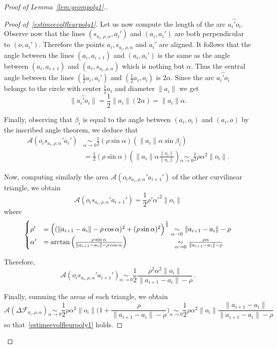 \documentclass[10pt]{amsart}
\theoremstyle{definition}\newtheorem{defi}[theo]{Definition}\newtheorem{rema}[theo]{Remark}\newtheorem{exam}[theo]{Example}\newtheorem{exem}[theo]{Example}\newtheorem{nota}[theo]{Notation}
\newcommand{\cA}{\mathcal{A}}
\newcommand{\cF}{\mathcal{F}}
\newcommand{\noi}{\noindent}
\newenvironment*{prooff}{\begin{proof}}{\let\qed\relax\end{proof}}
\begin{document}
\begin{proof}[{Proof of Lemma~\ref{lem:geompoly1}.}]
\begin{prooff}[{Proof of~\eqref{estimeevolfleurpoly1}}]
Let us now compute the length of the arc $\overset{\frown}{a_i'o_i}$. Observe now that the lines $(s_{a_i,\rho,\alpha},a_i')$ and $(a_i,a_i')$ are both perpendicular to $(o,a_i')$. Therefore the points $a_i, s_{a_i,\rho,\alpha}$ and $a_i'$ are aligned. It follows that the angle between the lines $(a_i,a_{i+1})$ and $(a_i,a_i')$ is the same as the angle between $(a_i,a_{i+1})$ and $(a_i,s_{a_i,\rho,\alpha})$ which is nothing but $\alpha$. Thus the central angle between the lines $(\tfrac{1}{2}a_i,a_i')$ and $(\tfrac{1}{2}a_i,o_i)$ is $2\alpha$. Since the arc $\overset{\frown}{a_i'o_i}$ belongs to the circle with center $\tfrac{1}{2}a_i$ and diameter $\|a_i\|$ we get
\[
\|\overset{\frown}{a_i'o_i}\| = \frac1{2}\|a_i\|(2\alpha) = \|a_i\|\alpha.
\]

Finally, observing that $\beta_i$ is equal to the angle between $(a_i,o_i)$ and $(a_i,o)$ by the inscribed angle theorem, we deduce that
\begin{align*}
\cA\left(o_i s_{a_i,\rho,\alpha}' a_i'\right) &\underset{\alpha\to 0}{\sim} \frac1{2}\left(\rho\sin \alpha\right)\left(\|a_i\|\alpha\sin\beta_i \right) \\
&= \frac1{2}\left(\rho\sin \alpha\right)\left(\|a_i\|\alpha \frac{\|o_i\|}{\|a_i\|}\right)
\underset{\alpha\to 0}{\sim} \frac1{2}\rho \alpha^2\|o_i\|.
\end{align*}

Now, computing similarly the area $\cA(o_i s_{a_i,\rho,\alpha}' a_{i+1}')$ of the other curvilinear triangle, we obtain
\[
\cA\left(o_i s_{a_i,\rho,\alpha}' a_{i+1}'\right) = \frac1{2}\rho' \alpha'^2\|o_i\|
\]
where
\[
\begin{cases}
\rho' & = \Big((\|a_{i+1}-a_i\|-\rho\cos\alpha)^2+(\rho\sin\alpha)^2\Big)^{\frac1{2}} \underset{\alpha\to 0}{\sim} \|a_{i+1}-a_i\|-\rho \\
\alpha' & = \arctan\left(\frac{\rho\sin\alpha}{\|a_{i+1}-a_i\|-\rho\cos\alpha}\right) \mkern120mu\underset{\alpha\to 0}{\sim} \frac{\rho\alpha}{\|a_{i+1}-a_i\|-\rho}
\end{cases}
\]

Therefore,
\[
\cA\left(o_i s_{a_i,\rho,\alpha}' a_{i+1}'\right) \underset{\alpha\to 0}{\sim} \frac1{2}\frac{\rho^2\alpha^2\|o_i\|}{\|a_{i+1}-a_i\|-\rho}\,.
\]

Finally, summing the areas of each triangle, we obtain
\[
\cA\left(\Delta\cF_{a_i,\rho,\alpha}\right)\underset{\alpha\to0}{\sim} \frac1{2}\rho\alpha^2\|o_i\|\bigg(1+\frac{\rho}{\|a_{i+1}-a_i\|-\rho}\bigg)
\underset{\alpha\to0}{\sim} \frac1{2}\rho\alpha^2\|o_i\|\frac{\|a_{i+1}-a_i\|}{\|a_{i+1}-a_i\|-\rho}
\]
so that~\eqref{estimeevolfleurpoly1} holds.
\end{prooff}


\end{proof}
\end{document}

